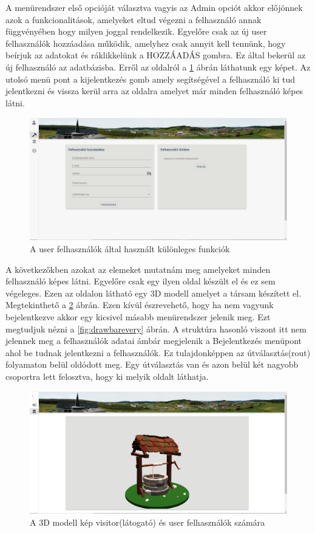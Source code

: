 A menürendszer első opcióját választva vagyis az Admin opciót akkor előjönnek azok a funkcionalitások, amelyeket eltud végezni a felhasználó annak függvényében hogy milyen joggal rendelkezik. Egyelőre csak az új user felhasználók hozzáadása működik, amelyhez csak annyit kell tennünk, hogy beírjuk az adatokat és ráklikkelünk a HOZZÁADÁS gombra. Ez által bekerül az új felhasználó az adatbázisba. Erről az oldalról a \ref{fig:admin} ábrán láthatunk egy képet. Az utolsó menü pont a kijelentkezés gomb amely segítségével a felhasználó ki  tud jelentkezni és vissza kerül arra az oldalra amelyet már minden felhasználó képes látni.
\begin{figure}
	\centering
	\includegraphics[scale=0.4]{figures/images/admin.png}
	\caption{A user felhasználók által használt különleges funkciók}
	\label{fig:admin}
\end{figure}
	
A következőkben azokat az elemeket mutatnám meg amelyeket minden felhasználó képes látni. Egyelőre csak egy ilyen oldal készült el és ez sem végeleges. Ezen az oldalon látható egy 3D modell amelyet a társam készített el. Megtekinthető a \ref{fig:modell} ábrán. Ezen kívül észrevehető, hogy ha nem vagyunk bejelentkezve akkor egy kicsivel másabb menürendszer jelenik meg. Ezt megtudjuk nézni a \ref{fig:drawbarevery} ábrán. A struktúra hasonló viszont itt nem jelennek meg a felhasználók adatai ámbár megjelenik a Bejelentkezés menüpont ahol be tudnak jelentkezni a felhasználók. Ez tulajdonképpen az útválasztás(rout) folyamaton belül oldódott meg. Egy útválasztás van és azon belül két nagyobb csoportra lett felosztva, hogy ki melyik oldalt láthatja. 
	
\begin{figure}
	\centering
	\includegraphics[scale=0.4]{figures/images/modell.png}
	\caption{A 3D modell kép visitor(látogató) és user felhasználók számára}
	\label{fig:modell}
\end{figure}

